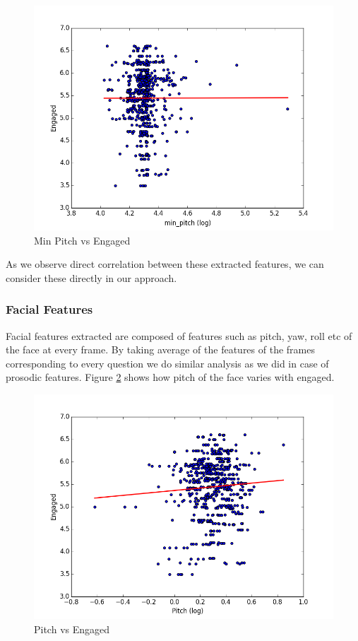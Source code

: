 \documentclass[11pt]{article}
\begin{document}
\begin{figure}[h!]
\begin{center}
\includegraphics[width=0.65\columnwidth]{figures/Engaged and min_pitch.png}
\caption{Min Pitch vs Engaged}
\label{fig:prosodic_analysis4}
\end{center}
\end{figure}

As we observe direct correlation between these extracted features, we can consider these directly in our approach.

\subsubsection{Facial Features}
Facial features extracted are composed of features such as pitch, yaw, roll etc of the face at every frame. By taking average of the features of the frames corresponding to every question we do similar analysis as we did in case of prosodic features. Figure \ref{fig:facial_analysis} shows how pitch of the face varies with engaged.

\begin{figure}[h!]
\begin{center}
\includegraphics[width=0.65\columnwidth]{figures/Engaged and Pitch.png}
\caption{Pitch vs Engaged}
\label{fig:facial_analysis}
\end{center}
\end{figure}
\end{document}
